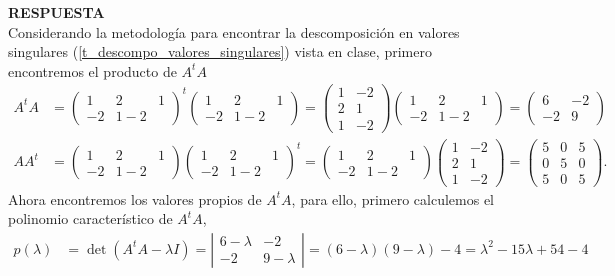 \documentclass[11pt,letterpaper]{article}
\newcommand{\res}{\textbf{RESPUESTA}\\}
\begin{document}
\begin{enumerate}
\res Considerando la metodología para encontrar la descomposición en valores singulares (\ref{t_descompo_valores_singulares}) vista en clase, primero encontremos el producto de $A^tA$
\begin{align*}
A^tA& =\begin{pmatrix}
1 & 2 & 1 \\
-2 & 1 -2 
\end{pmatrix}^t \begin{pmatrix}
1 & 2 & 1 \\
-2 & 1 -2 
\end{pmatrix}=\begin{pmatrix}
1 & -2\\
2 & 1 \\
1 & -2
\end{pmatrix} \begin{pmatrix}
1 & 2 & 1 \\
-2 & 1 -2 
\end{pmatrix} = \begin{pmatrix}
6 & -2 \\
-2 & 9
\end{pmatrix}\\
AA^t& =\begin{pmatrix}
1 & 2 & 1 \\
-2 & 1 -2 
\end{pmatrix} \begin{pmatrix}
1 & 2 & 1 \\
-2 & 1 -2 
\end{pmatrix}^t=\begin{pmatrix}
1 & 2 & 1 \\
-2 & 1 -2 
\end{pmatrix}\begin{pmatrix}
1 & -2\\
2 & 1 \\
1 & -2
\end{pmatrix}  = \begin{pmatrix}
5 & 0 & 5\\
0& 5 & 0\\
5 & 0 & 5
\end{pmatrix}.
\end{align*}
Ahora encontremos los valores propios de $A^tA$, para ello, primero calculemos el polinomio característico de $A^tA$,
\begin{align*}
p(\lambda) &= \det (A^tA-\lambda I)=
\left|\begin{array}{ccc}
6-\lambda& -2 \\
-2 & 9-\lambda
\end{array} \right| =(6-\lambda)(9-\lambda)-4=\lambda^2-15\lambda+54-4\\

\end{align*}
\end{enumerate}
\end{document}

